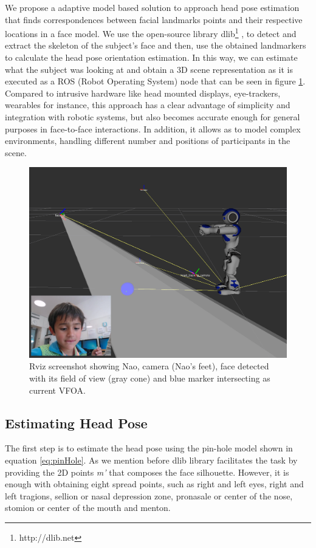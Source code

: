 \documentclass{sig-alternate}
\begin{document}
We propose a adaptive model based solution to approach head pose estimation that finds correspondences between facial landmarks points and their respective locations in a face model. We use the open-source library dlib\footnote{http://dlib.net} \cite{dlib09}, to detect and extract the skeleton of the subject's face and then, use the obtained landmarkers to calculate the head pose orientation estimation. In this way, we can estimate what the subject was looking at and obtain a 3D scene representation as it is executed as a ROS (Robot Operating System) node that can be seen in figure \ref{rviz}. Compared to intrusive hardware like head mounted displays, eye-trackers, wearables for instance, this approach has a clear advantage of simplicity and integration with robotic systems, but also becomes accurate enough for general purposes in face-to-face interactions. In addition, it allows as to model complex environments, handling different number and positions of participants in the scene.

\begin{figure}
    \centering
    \includegraphics[width=0.9\columnwidth]{rviz_camera}
    \caption{\small Rviz screenshot showing Nao, camera (Nao's feet), face detected with its field of view (gray cone) and blue marker intersecting as current VFOA.}
    \label{rviz}
\end{figure}

\subsection{Estimating Head Pose}
The first step is to estimate the head pose using the pin-hole model shown in equation \ref{eq:pinHole}. As we mention before dlib library facilitates the task by providing the 2D points \textit{m'} that composes the face silhouette. However, it is enough with obtaining eight spread points, such as right and left eyes, right and left tragions, sellion or nasal depression zone, pronasale or center of the nose, stomion or center of the mouth and menton.
\end{document}
